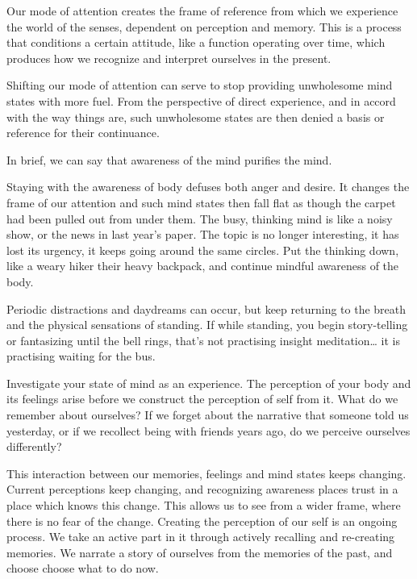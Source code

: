 Our mode of attention creates the frame of reference from which we
experience the world of the senses, dependent on perception and memory.
This is a process that conditions a certain attitude, like a function
operating over time, which produces how we recognize and interpret
ourselves in the present.

Shifting our mode of attention can serve to stop providing unwholesome
mind states with more fuel. From the perspective of direct experience,
and in accord with the way things are, such unwholesome states are then
denied a basis or reference for their continuance.

In brief, we can say that awareness of the mind purifies the mind.

Staying with the awareness of body defuses both anger and desire. It
changes the frame of our attention and such mind states then fall flat
as though the carpet had been pulled out from under them. The busy,
thinking mind is like a noisy show, or the news in last year's paper.
The topic is no longer interesting, it has lost its urgency, it keeps
going around the same circles. Put the thinking down, like a weary hiker
their heavy backpack, and continue mindful awareness of the body.

Periodic distractions and daydreams can occur, but keep returning to the
breath and the physical sensations of standing. If while standing, you
begin story-telling or fantasizing until the bell rings, that's not
practising insight meditation\ldots{} it is practising waiting for the
bus.


Investigate your state of mind as an experience. The perception of your
body and its feelings arise before we construct the perception of self
from it. What do we remember about ourselves? If we forget about the
narrative that someone told us yesterday, or if we recollect being with
friends years ago, do we perceive ourselves differently?

This interaction between our memories, feelings and mind states keeps
changing. Current perceptions keep changing, and recognizing awareness
places trust in a place which knows this change. This allows us to see
from a wider frame, where there is no fear of the change. Creating the
perception of our self is an ongoing process. We take an active part in
it through actively recalling and re-creating memories. We narrate a
story of ourselves from the memories of the past, and choose choose what
to do now.


